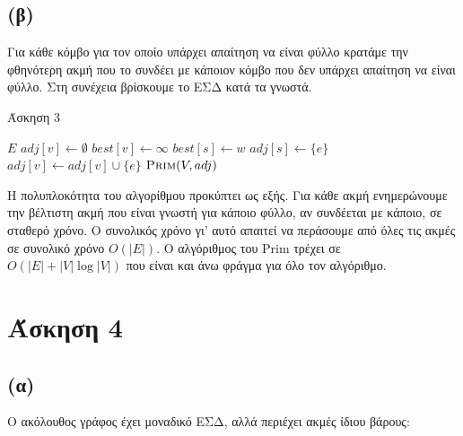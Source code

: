 \documentclass[11pt,a4paper,oneside]{report}
\begin{document}
\subsection*{(β)}
Για κάθε κόμβο για τον οποίο υπάρχει απαίτηση να είναι φύλλο κρατάμε την φθηνότερη ακμή που το συνδέει με κάποιον κόμβο που δεν υπάρχει απαίτηση να είναι φύλλο. Στη συνέχεια βρίσκουμε το ΕΣΔ κατά τα γνωστά.

\begin{algorithm}[H]
\caption{\textgreek{Άσκηση 3}}
\begin{algorithmic}[1]

	    \State \Return $E$
	\EndIf
        \State $adj[ v ] \gets \emptyset$
        \State $best[ v ] \gets \infty$
    \EndFor
                            \State $best[ s ] \gets w$
                            \State $adj[ s ] \gets \{ e \}$
                        \EndIf
                    \EndIf
                \EndFor
            \Else
                \State $adj[ v ] \gets adj[ v ] \cup \{ e \}$
            \EndIf
        \EndIf
    \EndFor
    \State \Return $\Call{Prim}{V, adj}$
\EndProcedure
\end{algorithmic}
\end{algorithm}

Η πολυπλοκότητα του αλγορίθμου προκύπτει ως εξής. Για κάθε ακμή ενημερώνουμε την βέλτιστη ακμή που είναι γνωστή για κάποιο φύλλο, αν συνδέεται με κάποιο, σε σταθερό χρόνο. Ο συνολικός χρόνο γι' αυτό απαιτεί να περάσουμε από όλες τις ακμές σε συνολικό χρόνο $O( |E| )$. Ο αλγόριθμος του \textlatin{Prim} τρέχει σε $O(|E| + |V|\log|V|)$ που είναι και άνω φράγμα για όλο τον αλγόριθμο.

\section*{Άσκηση 4}
\subsection*{(α)}

Ο ακόλουθος γράφος έχει μοναδικό ΕΣΔ, αλλά περιέχει ακμές ίδιου βάρους:

\begin{figure}[ht]
	\centering
\end{figure}
\end{document}
